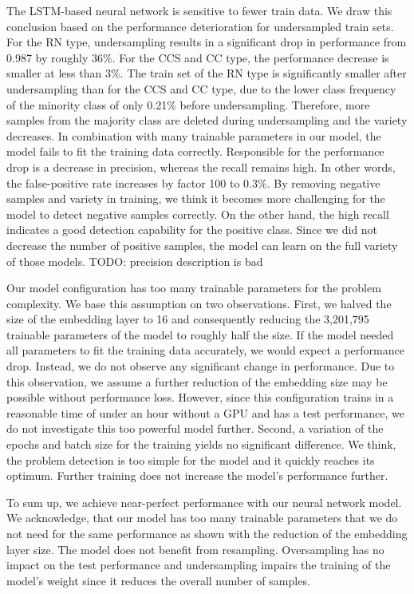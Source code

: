The LSTM-based neural network is sensitive to fewer train data. We draw this conclusion based on the performance deterioration for undersampled train sets. For the RN type, undersampling results in a significant drop in performance from 0.987 by roughly 36\%. For the CCS and CC type, the performance decrease is smaller at less than 3\%. The train set of the RN type is significantly smaller after undersampling than for the CCS and CC type, due to the lower class frequency of the minority class of only 0.21\% before undersampling. Therefore, more samples from the majority class are deleted during undersampling and the variety decreases. In combination with many trainable parameters in our model, the model fails to fit the training data correctly. 
Responsible for the performance drop is a decrease in precision, whereas the recall remains high. In other words, the false-positive rate increases by factor 100 to 0.3\%. By removing negative samples and variety in training, we think it becomes more challenging for the model to detect negative samples correctly. On the other hand, the high recall indicates a good detection capability for the positive class. Since we did not decrease the number of positive samples, the model can learn on the full variety of those models. TODO: precision description is bad


Our model configuration has too many trainable parameters for the problem complexity. We base this assumption on two observations. First, we halved the size of the embedding layer to 16 and consequently reducing the 3,201,795 trainable parameters of the model to roughly half the size. If the model needed all parameters to fit the training data accurately, we would expect a performance drop. Instead, we do not observe any significant change in performance. Due to this observation, we assume a further reduction of the embedding size may be possible without performance loss. However, since this configuration trains in a reasonable time of under an hour without a GPU and has a test performance, we do not investigate this too powerful model further.
Second, a variation of the epochs and batch size for the training yields no significant difference. We think, the problem detection is too simple for the model and it quickly reaches its optimum. Further training does not increase the model's performance further. 


To sum up, we achieve near-perfect performance with our neural network model. We acknowledge, that our model has too many trainable parameters that we do not need for the same performance as shown with the reduction of the embedding layer size. The model does not benefit from resampling. Oversampling has no impact on the test performance and undersampling impairs the training of the model's weight since it reduces the overall number of samples.

